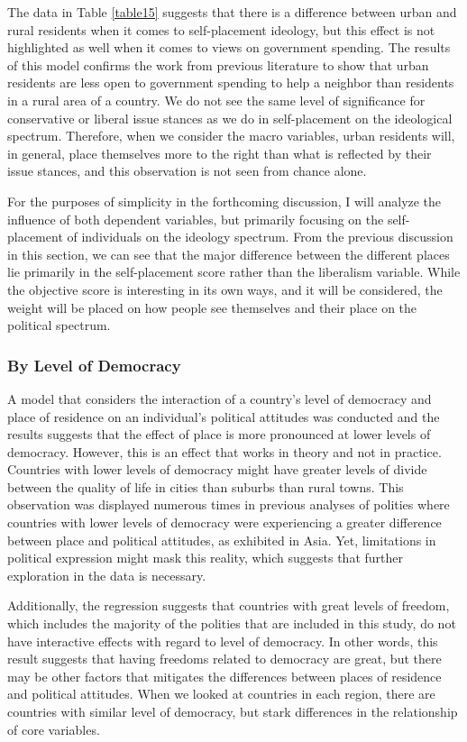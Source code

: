 \documentclass[12pt, titlepage]{article}
\begin{document}
The data in Table \ref{table15} suggests that there is a difference between urban and rural residents when it comes to self-placement ideology, but this effect is not highlighted as well when it comes to views on government spending. The results of this model confirms the work from previous literature to show that urban residents are less open to government spending to help a neighbor than residents in a rural area of a country. We do not see the same level of significance for conservative or liberal issue stances as we do in self-placement on the ideological spectrum. Therefore, when we consider the macro variables, urban residents will, in general, place themselves more to the right than what is reflected by their issue stances, and this observation is not seen from chance alone.

For the purposes of simplicity in the forthcoming discussion, I will analyze the influence of both dependent variables, but primarily focusing on the self-placement of individuals on the ideology spectrum. From the previous discussion in this section, we can see that the major difference between the different places lie primarily in the self-placement score rather than the liberalism variable. While the objective score is interesting in its own ways, and it will be considered, the weight will be placed on how people see themselves and their place on the political spectrum. 

\subsubsection{By Level of Democracy}

A model that considers the interaction of a country's level of democracy and place of residence on an individual's political attitudes was conducted and the results suggests that the effect of place is more pronounced at lower levels of democracy. However, this is an effect that works in theory and not in practice. Countries with lower levels of democracy might have greater levels of divide between the quality of life in cities than suburbs than rural towns. This observation was displayed numerous times in previous analyses of polities where countries with lower levels of democracy were experiencing a greater difference between place and political attitudes, as exhibited in Asia. Yet, limitations in political expression might mask this reality, which suggests that further exploration in the data is necessary. 

Additionally, the regression suggests that countries with great levels of freedom, which includes the majority of the polities that are included in this study, do not have interactive effects with regard to level of democracy. In other words, this result suggests that having freedoms related to democracy are great, but there may be other factors that mitigates the differences between places of residence and political attitudes. When we looked at countries in each region, there are countries with similar level of democracy, but stark differences in the relationship of core variables.
\end{document}
